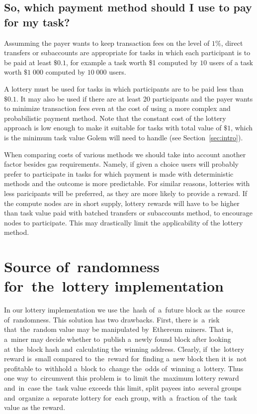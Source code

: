 \documentclass[a4paper]{article}
\begin{document}
    \subsection{So, which payment method should I use to pay for my task?}
    Assumming the payer wants to keep transaction fees on the level of $1\%$,
    direct transfers or subaccounts are appropriate for tasks in which
    each participant is to be paid at least $\$0.1$, for example a
    task worth \$1 computed by $10$ users of a task worth $\$1\;000$
    computed by $10\;000$ users.

    A lottery must be used for tasks in which participants are to be paid less than $\$0.1$.
    It may also be used if there are at least 20 participants and the payer wants to
    minimize transaction fees even at the cost of using a more complex and probabilistic payment method.
    Note that the constant cost of the lottery approach is low enough to make it suitable for tasks with
    total value of $\$1$, which is the minimum task value Golem will need to handle (see Section~\ref{sec:intro}).

    When comparing costs of various methods we should take into account another factor besides gas requirements.
    Namely, if given a choice users will probably prefer to participate in tasks for which payment is made with
    deterministic methods and the outcome is more predictable. For similar reasons, lotteries with less paricipants
    will be preferred, as they are more likely to provide a reward.
    If the compute nodes are in short supply, lottery rewards will have to be higher than task value paid with
    batched transfers or subaccounts method, to encourage nodes to participate. This may drastically limit the
    applicability of the lottery method.

\section{Source of~randomness for~the~lottery implementation}
\label{sec:randomness}
    In our lottery implementation we use the~hash of~a~future block as the~source of~randomness. This solution has
    two drawbacks. First, there is~a~risk that~the~random value may be manipulated by~Ethereum miners. That is,
    a~miner may decide whether to~publish a~newly found block after looking at~the~block hash and~calculating
    the~winning address. Clearly, if~the~lottery reward is~small compared to~the~reward for~finding a~new block
    then it is~not profitable to~withhold a~block to~change the~odds of~winning a~lottery. Thus one way to~circumvent
    this problem is~to limit the~maximum lottery reward and~in~case the~task value exceeds this limit, split payees
    into~several groups and~organize a~separate lottery for~each group, with~a~fraction of~the~task value as the
    reward.
\end{document}
